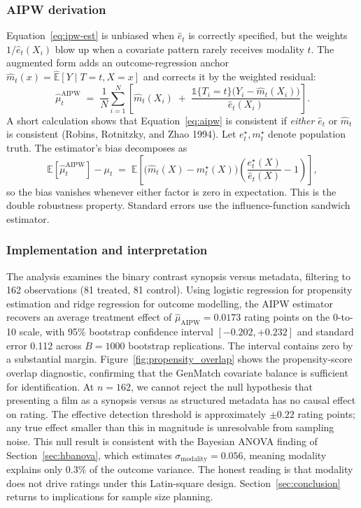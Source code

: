 \documentclass{article}
\begin{document}
\subsubsection*{AIPW derivation}

Equation~\ref{eq:ipw-est} is unbiased when $\hat e_t$ is correctly specified, but the weights $1/\hat e_t(X_i)$ blow up when a covariate pattern rarely receives modality $t$. The augmented form adds an outcome-regression anchor $\hat m_t(x) = \widehat{\mathbb{E}}[Y \mid T = t, X = x]$ and corrects it by the weighted residual:
\begin{equation}
\hat\mu_t^{\mathrm{AIPW}} \;=\; \frac{1}{N}\sum_{i=1}^N\!\left[\hat m_t(X_i) \;+\; \frac{\mathbb{1}\{T_i = t\}\bigl(Y_i - \hat m_t(X_i)\bigr)}{\hat e_t(X_i)}\right].
\label{eq:aipw}
\end{equation}
A short calculation shows that Equation~\ref{eq:aipw} is consistent if \emph{either} $\hat e_t$ or $\hat m_t$ is consistent (Robins, Rotnitzky, and Zhao 1994). Let $e_t^\star, m_t^\star$ denote population truth. The estimator's bias decomposes as
\begin{equation}
\mathbb{E}[\hat\mu_t^{\mathrm{AIPW}}] - \mu_t \;=\; \mathbb{E}\!\left[\bigl(\hat m_t(X) - m_t^\star(X)\bigr)\!\left(\frac{e_t^\star(X)}{\hat e_t(X)} - 1\right)\right],
\label{eq:dr}
\end{equation}
so the bias vanishes whenever either factor is zero in expectation. This is the double robustness property. Standard errors use the influence-function sandwich estimator.

\subsubsection*{Implementation and interpretation}

The analysis examines the binary contrast synopsis versus metadata, filtering to 162 observations (81 treated, 81 control). Using logistic regression for propensity estimation and ridge regression for outcome modelling, the AIPW estimator recovers an average treatment effect of $\hat\mu_{\mathrm{AIPW}} = 0.0173$ rating points on the 0-to-10 scale, with 95\% bootstrap confidence interval $[-0.202, +0.232]$ and standard error 0.112 across $B=1000$ bootstrap replications. The interval contains zero by a substantial margin. Figure~\ref{fig:propensity_overlap} shows the propensity-score overlap diagnostic, confirming that the GenMatch covariate balance is sufficient for identification. At $n = 162$, we cannot reject the null hypothesis that presenting a film as a synopsis versus as structured metadata has no causal effect on rating. The effective detection threshold is approximately $\pm 0.22$ rating points; any true effect smaller than this in magnitude is unresolvable from sampling noise. This null result is consistent with the Bayesian ANOVA finding of Section~\ref{sec:hbanova}, which estimates $\sigma_{\mathrm{modality}} = 0.056$, meaning modality explains only 0.3\% of the outcome variance. The honest reading is that modality does not drive ratings under this Latin-square design. Section~\ref{sec:conclusion} returns to implications for sample size planning.
\end{document}

